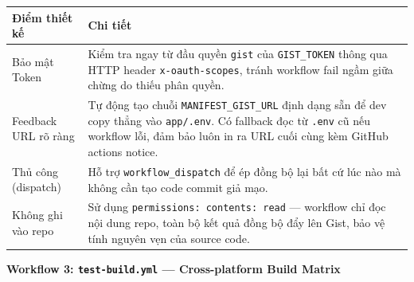 \documentclass[12pt,a4paper]{article}
\begin{document}
\begin{tabularx}{\linewidth}{|l|X|}
  \hline
  \rowcolor{backendColor!10}
  \textbf{Điểm thiết kế} & \textbf{Chi tiết} \\
  \hline
  Bảo mật Token & Kiểm tra ngay từ đầu quyền \texttt{gist} của \texttt{GIST\_TOKEN} thông qua HTTP header \texttt{x-oauth-scopes}, tránh workflow fail ngầm giữa chừng do thiếu phân quyền. \\
  \hline
  Feedback URL rõ ràng & Tự động tạo chuỗi \texttt{MANIFEST\_GIST\_URL} định dạng sẵn để dev copy thẳng vào \texttt{app/.env}. Có fallback đọc từ \texttt{.env} cũ nếu workflow lỗi, đảm bảo luôn in ra URL cuối cùng kèm GitHub actions notice. \\
  \hline
  Thủ công (dispatch) & Hỗ trợ \texttt{workflow\_dispatch} để ép đồng bộ lại bất cứ lúc nào mà không cần tạo code commit giả mạo. \\
  \hline
  Không ghi vào repo & Sử dụng \texttt{permissions: contents: read} --- workflow chỉ đọc nội dung repo, toàn bộ kết quả đồng bộ đẩy lên Gist, bảo vệ tính nguyên vẹn của source code. \\
  \hline
\end{tabularx}

\vspace{6pt}
\noindent\textbf{Workflow 3: \texttt{test-build.yml} --- Cross-platform Build Matrix}
\end{document}
